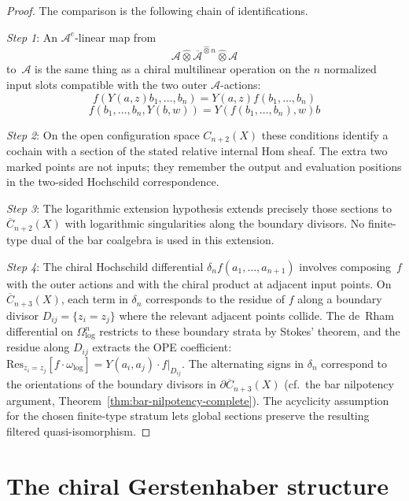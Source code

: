 \begin{proof}
The comparison is the following chain of identifications.

\emph{Step 1}: An $\mathcal{A}^e$-linear map from
\[
\mathcal A\widehat\otimes
\overline{\mathcal A}^{\widehat\otimes n}
\widehat\otimes\mathcal A
\]
to~$\mathcal A$ is the same thing as a chiral multilinear operation
on the $n$ normalized input slots compatible with the two outer
$\mathcal A$-actions:
\[
f(Y(a, z)b_1, \ldots, b_n) = Y(a, z)f(b_1, \ldots, b_n)
\]
\[
f(b_1, \ldots, b_n, Y(b, w)) = Y(f(b_1, \ldots, b_n), w)b
\]

\emph{Step 2}: On the open configuration space $C_{n+2}(X)$ these
conditions identify a cochain with a section of the stated relative
internal Hom sheaf.  The extra two marked points are not inputs; they
remember the output and evaluation positions in the two-sided
Hochschild correspondence.

\emph{Step 3}: The logarithmic extension hypothesis extends precisely
those sections to $\overline{C}_{n+2}(X)$ with logarithmic
singularities along the boundary divisors.  No finite-type dual of
the bar coalgebra is used in this extension.

\emph{Step 4}: The chiral Hochschild differential
$\delta_n f(a_1,\ldots,a_{n+1})$ involves composing~$f$ with the
outer actions and with the chiral product at adjacent input points.
On $\overline{C}_{n+3}(X)$, each term in $\delta_n$ corresponds to the
residue of $f$ along a boundary divisor
$D_{ij}=\{z_i=z_j\}$ where the relevant adjacent points collide.
The de~Rham differential on $\Omega^n_{\log}$ restricts to these
boundary strata by Stokes' theorem, and the residue along
$D_{ij}$ extracts the OPE coefficient: $\mathrm{Res}_{z_i = z_j}
[f \cdot \omega_{\log}] = Y(a_i, a_j) \cdot f|_{D_{ij}}$.
The alternating signs in $\delta_n$ correspond to the orientations
of the boundary divisors in $\partial\overline{C}_{n+3}(X)$
(cf.\ the bar nilpotency argument,
Theorem~\ref{thm:bar-nilpotency-complete}).  The acyclicity
assumption for the chosen finite-type stratum lets global sections
preserve the resulting filtered quasi-isomorphism. \qedhere
\end{proof}


\section{The chiral Gerstenhaber structure}

